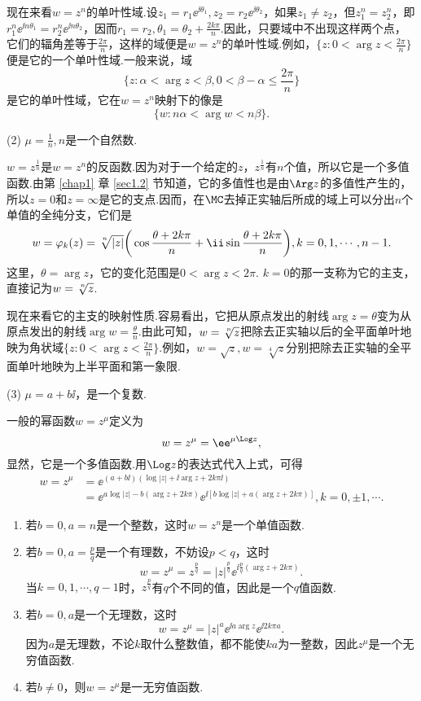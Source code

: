 现在来看$w=z^n$的单叶性域.设$z_1=r_1\ee^{\ii\theta_1},z_2=r_2\ee^{\ii\theta_2}$，如果$z_1\ne z_2$，但$z_1^n=z_2^n$，即$r_1^n\ee^{\ii n\theta_1}=r_2^n\ee^{\ii n\theta_2}$，因而$r_1=r_2,\theta_1=\theta_2+\frac{2k\pi}n$.因此，只要域中不出现这样两个点，它们的辐角差等于$\frac{2\pi}n$，这样的域便是$w=z^n$的单叶性域.例如，$\bigg\{z:0<\arg z<\frac{2\pi}n\bigg\}$便是它的一个单叶性域.一般来说，域
\[\bigg\{z:\alpha<\arg z<\beta,0<\beta-\alpha\le\frac{2\pi}n\bigg\}\]
是它的单叶性域，它在$w=z^n$映射下的像是
\[\{w:n\alpha<\arg w<n\beta\}.\]

(2) $\mu=\frac1n,n${\kaishu 是一个自然数.}

$w=z^{\frac1n}$是$w=z^n$的反函数.因为对于一个给定的$z$，$z^{\frac1n}$有$n$个值，所以它是一个多值函数.由第 \ref{chap1} 章 \ref{sec1.2} 节知道，它的多值性也是由$\Arg z$的多值性产生的，所以$z=0$和$z=\infty$是它的支点.因而，在$\MC$去掉正实轴后所成的域上可以分出$n$个单值的全纯分支，它们是
\[w=\varphi_k(z)=\sqrt[\leftroot{-1}\uproot{2} n]{|z|}\bigg(\cos\frac{\theta+2k\pi}n+
\ii\sin\frac{\theta+2k\pi}n\bigg),k=0,1,\cdots,n-1.\]
这里，$\theta=\arg z$，它的变化范围是$0<\arg z<2\pi$. $k=0$的那一支称为它的主支，直接记为$w=\sqrt[\leftroot{-1}\uproot{2} n]z$.

现在来看它的主支的映射性质.容易看出，它把从原点发出的射线$\arg z=\theta$变为从原点发出的射线$\arg w=\frac\theta n$.由此可知，$w=\sqrt[\leftroot{-1}\uproot{2} n]z$把除去正实轴以后的全平面单叶地映为角状域$\bigg\{z:0<\arg z<\frac{2\pi}n\bigg\}$.例如，$w=\sqrt z,w=\sqrt[4]z$分别把除去正实轴的全平面单叶地映为上半平面和第一象限.

(3) $\mu=a+b\ii$，{\kaishu 是一个复数.}

一般的幂函数$w=z^\mu$定义为
\[w=z^\mu=\ee^{\mu\Log z},\]
显然，它是一个多值函数.用$\Log z$的表达式代入上式，可得
\begin{align*}
w=z^\mu&=\ee^{(a+b\ii)(\log|z|+\ii\arg z+2k\pi \ii)}\\
&=\ee^{a\log|z|-b(\arg z+2k\pi)}\ee^{\ii[b\log|z|+a(\arg z+2k\pi)]},k=0,\pm1,\cdots.
\end{align*}
\begin{enumerate}[label=(\alph*),left=0.85cm]
  \item \label{2.5.3.1} 若$b=0,a=n$是一个整数，这时$w=z^n$是一个单值函数.
  \item \label{2.5.3.2} 若$b=0,a=\frac pq$是一个有理数，不妨设$p<q$，这时
  \[w=z^\mu=z^{\frac pq}=|z|^{\frac pq}\ee^{\ii\frac pq(\arg z+2k\pi)}.\]
  当$k=0,1,\cdots,q-1$时，$z^{\frac pq}$有$q$个不同的值，因此是一个$q$值函数.
  \item \label{2.5.3.3} 若$b=0,a$是一个无理数，这时
  \[w=z^\mu=|z|^a\ee^{\ii a\arg z}\ee^{\ii2k\pi a}.\]
  因为$a$是无理数，不论$k$取什么整数值，都不能使$ka$为一整数，因此$z^\mu$是一个无穷值函数.
  \item \label{2.5.3.4} 若$b\ne0$，则$w=z^\mu$是一无穷值函数.
\end{enumerate}

